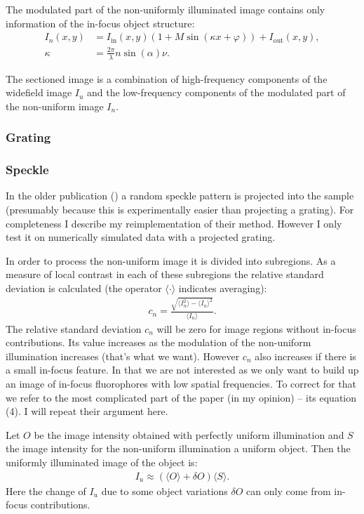 \documentclass[11pt,abstracton,titlepage]{scrartcl}
\newcommand{\avg}[1]{\langle #1 \rangle}
\begin{document}
The modulated part of the non-uniformly illuminated image contains only
information of the in-focus object structure:
\begin{align}
  I_n(x,y)&=I_\textrm{in}(x,y)(1+M
  \sin(\kappa x+\varphi))+I_\textrm{out}(x,y),\\
  \kappa&=\frac{2\pi}{\lambda}n\sin(\alpha)\nu.
\end{align}

The sectioned image is a combination of high-frequency components of
the widefield image $I_u$ and the low-frequency components of the
modulated part of the non-uniform image $I_n$.

\subsubsection{Grating}

\subsubsection{Speckle}
In the older publication (\cite{2008Lim}) a random speckle pattern is
projected into the sample (presumably because this is experimentally
easier than projecting a grating). For completeness I describe my
reimplementation of their method. However I only test it on
numerically simulated data with a projected grating.

In order to process the non-uniform image it is divided into
subregions.  As a measure of local contrast in each of these
subregions the relative standard deviation is calculated 
(the operator $\avg{\cdot}$ indicates averaging):
\begin{align}
  c_n=\frac{\sqrt{\avg{I_n^2}-\avg{I_n}^2}}{\avg{I_n}}.
\end{align}
The relative standard deviation $c_n$ will be zero for image regions
without in-focus contributions. Its value increases as the modulation
of the non-uniform illumination increases (that's what we
want). However $c_n$ also increases if there is a small in-focus
feature. In that we are not interested as we only want to build up an
image of in-focus fluorophores with low spatial frequencies. To
correct for that we refer to the most complicated part of the paper
(in my opinion) -- its equation (4). I will repeat their argument
here.

Let $O$ be the image intensity obtained with perfectly uniform
illumination and $S$ the image intensity for the non-uniform
illumination a uniform object. Then the uniformly illuminated image of
the object is:
\begin{align}
  I_u\approx (\avg{O}+\delta O)\avg{S}.
\end{align}
Here the change of $I_u$ due to some object variations $\delta O$ can
only come from in-focus contributions.
\end{document}
